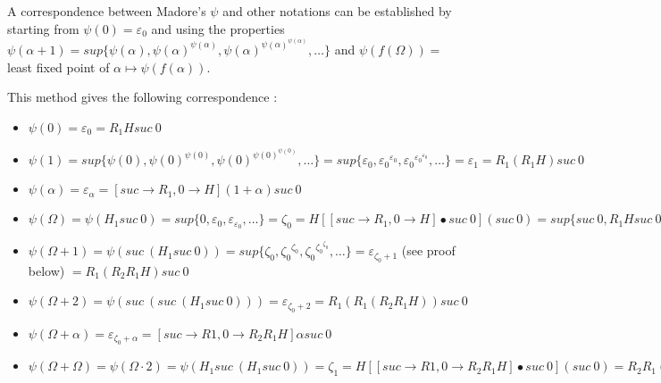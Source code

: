 \documentclass[10pt]{article}
\begin{document}
\bigskip

A correspondence between Madore's \( \psi \) and other notations can be established by starting from \( \psi(0) = \varepsilon_0 \) and using the properties \( \psi(\alpha+1) = sup \lbrace \psi(\alpha), \psi(\alpha)^{\psi(\alpha)}, \psi(\alpha)^{\psi(\alpha)^{\psi(\alpha)}}, \ldots \rbrace \) and \( \psi(f(\Omega)) = \) least fixed point of \( \alpha \mapsto \psi(f(\alpha)) \).

This method gives the following correspondence :

\begin{itemize}
     \setlength{\itemsep}{1pt}
     \setlength{\parskip}{0pt}
     \setlength{\parsep}{0pt}

\item \( \psi(0) = \varepsilon_0 = R_1 H suc\ 0 \)

\item \( \psi(1) = sup \lbrace \psi(0), \psi(0)^{\psi(0)}, \psi(0)^{\psi(0)^{\psi(0)}}, \ldots \rbrace = sup \lbrace \varepsilon_0, {\varepsilon_0}^{\varepsilon_0}, {\varepsilon_0}^{{\varepsilon_0}^{\varepsilon_0}}, \ldots \rbrace = \varepsilon_1 = R_1 (R_1 H) suc\ 0 \)

\item \( \psi(\alpha) = \varepsilon_\alpha = [suc \rightarrow R_1,0 \rightarrow H] (1+\alpha) suc\ 0 \)

\item \( \psi(\Omega) = \psi(H_1 suc\ 0) = sup \lbrace 0, \varepsilon_0, \varepsilon_{\varepsilon_0}, \ldots \rbrace = \zeta_0 = H [[suc \rightarrow R_1,0 \rightarrow H] \bullet suc\ 0] (suc\ 0) = sup \lbrace suc\ 0, R_1 H suc\ 0, R_1 H R_1 H suc\ 0, \ldots \rbrace = R_2 R_1 H suc\ 0 \)

\item \( \psi(\Omega+1) = \psi(suc\ (H_1 suc\ 0)) = sup \lbrace \zeta_0, {\zeta_0}^{\zeta_0}, {\zeta_0}^{{\zeta_0}^{\zeta_0}}, \ldots \rbrace = \varepsilon_{\zeta_0+1} \) (see proof below) \( = R_1 (R_2 R_1 H) suc\ 0 \)

\item \( \psi(\Omega+2) = \psi(suc\ (suc\ (H_1 suc\ 0))) = \varepsilon_{\zeta_0+2} = R_1 (R_1 (R_2 R_1 H)) suc\ 0 \)

\item \( \psi(\Omega+\alpha) = \varepsilon_{\zeta_0+\alpha} = [suc \rightarrow R1, 0 \rightarrow R_2 R_1 H] \alpha suc\ 0 \)

\item \( \psi(\Omega+\Omega) = \psi(\Omega \cdot 2) = \psi(H_1 suc\ (H_1 suc\ 0)) = \zeta_1 = H [[suc \rightarrow R1, 0 \rightarrow R_2 R_1 H] \bullet suc\ 0] (suc\ 0) = R_2 R_1 (R_2 R_1 H) suc\ 0 \)


\end{itemize}
\end{document}
